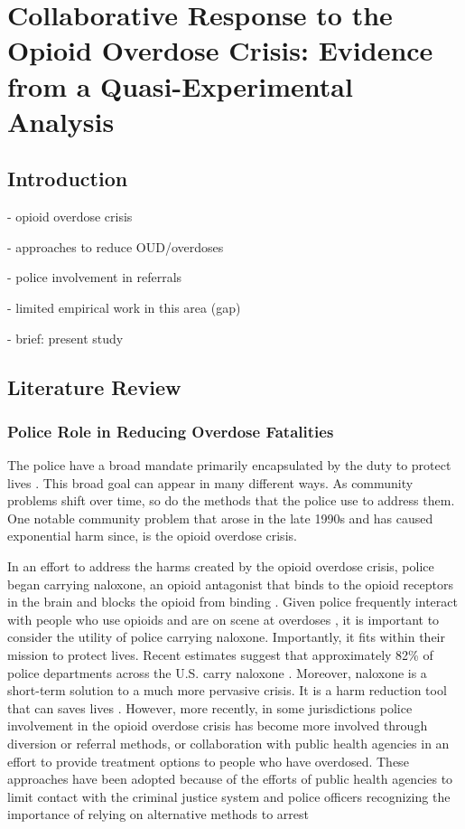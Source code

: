 \chapter{Collaborative Response to the Opioid Overdose Crisis: Evidence from a Quasi-Experimental Analysis}

\section{\centering Introduction}
- opioid overdose crisis

- approaches to reduce OUD/overdoses

- police involvement in referrals

    - limited empirical work in this area (gap)

- brief: present study

\section{\centering Literature Review}

\subsection{Police Role in Reducing Overdose Fatalities}

The police have a broad mandate primarily encapsulated by the duty to protect lives \parencite{skolnick_above_1993}. This broad goal can appear in many different ways. As community problems shift over time, so do the methods that the police use to address them. One notable community problem that arose in the late 1990s and has caused exponential harm since, is the opioid overdose crisis. 

In an effort to address the harms created by the opioid overdose crisis, police began carrying naloxone, an opioid antagonist that binds to the opioid receptors in the brain and blocks the opioid from binding \parencite{lurigio_opioid_2018}. Given police frequently interact with people who use opioids and are on scene at overdoses \parencite{beletsky_police_2011, silverman_harmonizing_2012, white_leveraging_2022}, it is important to consider the utility of police carrying naloxone. Importantly, it fits within their mission to protect lives. Recent estimates suggest that approximately 82\% of police departments across the U.S. carry naloxone \parencite{ray_national_2023}. Moreover, naloxone is a short-term solution to a much more pervasive crisis. It is a harm reduction tool that can saves lives \parencite{rando_intranasal_2015, rees_little_2019}. However, more recently, in some jurisdictions police involvement in the opioid overdose crisis has become more involved through diversion or referral methods, or collaboration with public health agencies in an effort to provide treatment options to people who have overdosed. These approaches have been adopted because of the efforts of public health agencies to limit contact with the criminal justice system and police officers recognizing the importance of relying on alternative methods to arrest \parencite{e.g., Aitken et al., 2002; Bluthenthal et al., 1999; Flath et al., 2019; Friedman et al., 2006; Reuter, 2009; Small et al., 2006}

